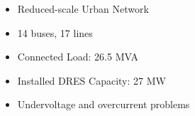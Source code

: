 \documentclass[xcolor=svgnames,aspectratio=32,8pt]{beamer}
\begin{document}
\begin{frame}
\begin{changemargin}{-0.8cm}{-1cm}
\begin{minipage}[!h]{0.45\paperwidth}



      \begin{itemize}
      \setlength{\itemindent}{-0.5em}

      \item Reduced-scale Urban Network
      \item 14 buses, 17 lines
      \item Connected Load: 26.5 MVA
      \item Installed DRES Capacity: 27 MW
      \item Undervoltage and overcurrent problems

      \end{itemize}

    \end{minipage}

  \end{changemargin}

\end{frame}

\end{document}
